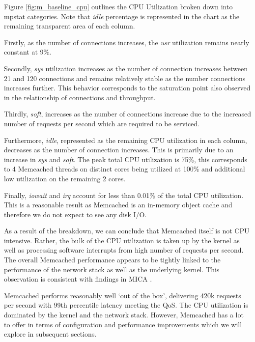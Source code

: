 Figure \ref{fig:m_baseline_cpu} outlines the CPU Utilization broken down into mpstat categories. Note that \textit{idle} percentage is represented in the chart as the remaining transparent area of each column.

Firstly, as the number of connections increases, the \textit{usr} utilization remains nearly constant at 9\%.

Secondly, \textit{sys} utilization increases as the number of connection increases between 21 and 120 connections and remains relatively stable as the number connections increases further. This behavior corresponds to the saturation point also observed in the relationship of connections and throughput.

Thirdly, \textit{soft}, increases as the number of connections increase due to the increased number of requests per second which are required to be serviced.

Furthermore, \textit{idle}, represented as the remaining CPU utilization in each column, decreases as the number of connection increases. This is primarily due to an increase in \textit{sys} and \textit{soft}. The peak total CPU utilization is 75\%, this corresponds to 4 Memcached threads on distinct cores being utilized at 100\% and additional low utilization on the remaining 2 cores.

Finally, \textit{iowait} and \textit{irq} account for less than 0.01\% of the total CPU utilization. This is a reasonable result as Memcached is an in-memory object cache and therefore we do not expect to see any disk I/O.

As a result of the breakdown, we can conclude that Memcached itself is not CPU intensive. Rather, the bulk of the CPU utilization is taken up by the kernel as well as processing software interrupts from high number of requests per second. The overall Memcached performance appears to be tightly linked to the performance of the network stack as well as the underlying kernel. This observation is consistent with findings in MICA \cite{lim2014mica}.

Memcached performs reasonably well `out of the box', delivering 420k requests per second with 99th percentile latency meeting the QoS. The CPU utilization is dominated by the kernel and the network stack. However, Memcached has a lot to offer in terms of configuration and performance improvements which we will explore in subsequent sections.



